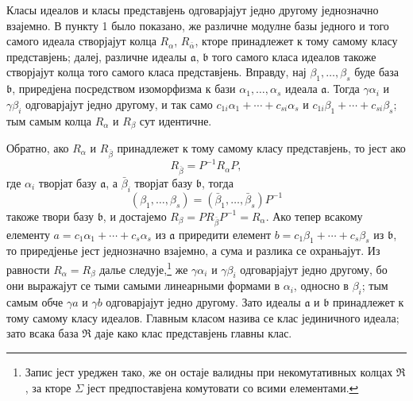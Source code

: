 \documentclass[11pt]{article}
\begin{document}
\setcounter{footnote}{25}

Класы идеалов и класы представјень одговарјајут једно другому једнозначно взајемно. В пункту 1 было показано, же различне модулне базы једного и того самого идеала створјајут колца $R_\alpha$, $R_{\bar\alpha}$, кторе принадлежет к тому самому класу представјень; далеј, различне идеалы $\mathfrak a$, $\mathfrak b$ того самого класа идеалов такоже створјајут колца того самого класа представјень. Вправду, нај $\beta_1,\ldots,\beta_s$ буде база $\mathfrak b$, приредјена посредством изоморфизма к бази $\alpha_1,\ldots,\alpha_s$ идеала $\mathfrak a$. Тогда $\gamma\alpha_i$ и $\gamma\beta_i$ одговарјајут једно другому, и так само $c_{1i}\alpha_1+\cdots+c_{si}\alpha_s$ и $c_{1i}\beta_1+\cdots+c_{si}\beta_s$; тым самым колца $R_\alpha$ и $R_\beta$ сут идентичне.

Обратно, ако $R_\alpha$ и $R_{\bar\beta}$ принадлежет к тому самому класу представјень, то јест ако
\[
        R_{\bar\beta}=P^{-1}R_\alpha P,
\]
где $\alpha_i$ творјат базу $\mathfrak a$, а $\bar\beta_i$ творјат базу $\mathfrak b$, тогда
\[
        (\beta_1,\ldots,\beta_s)=(\bar\beta_1,\ldots,\bar\beta_s)P^{-1}
\]
такоже твори базу $\mathfrak b$, и достајемо $R_\beta=PR_{\bar\beta}P^{-1}=R_\alpha$. Ако тепер всакому елементу $a=c_1\alpha_1+\cdots+c_s\alpha_s$ из $\mathfrak a$ приредити елемент $b=c_1\beta_1+\cdots+c_s\beta_s$ из $\mathfrak b$, то приредјенье јест једнозначно взајемно, а сума и разлика се охраньајут. Из равности $R_\alpha=R_\beta$ далье следује,\footnote{Запис јест уреджен тако, же он остаје валидны при некомутативных колцах $\mathfrak R$, за кторе $\Sigma$ јест предпоставјена комутовати со всими елементами.} же $\gamma\alpha_i$ и $\gamma\beta_i$ одговарјајут једно другому, бо они выражајут се тыми самыми линеарными формами в $\alpha_i$, односно в $\beta_i$; тым самым обче $\gamma a$ и $\gamma b$ одговарјајут једно другому. Зато идеалы $\mathfrak a$ и $\mathfrak b$ принадлежет к тому самому класу идеалов. Главным класом назива се клас јединичного идеала; зато всака база $\mathfrak R$ даје како клас представјень главны клас.
\end{document}
